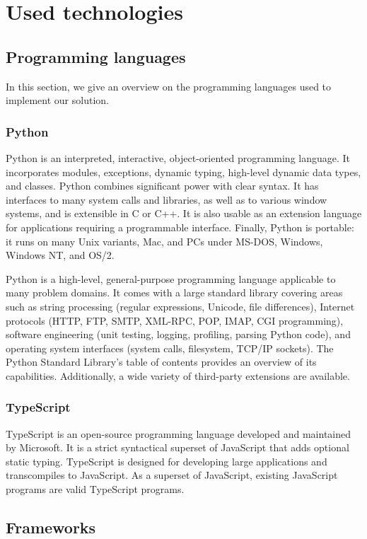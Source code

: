 \section{Used technologies}

\subsection{Programming languages}
In this section, we give an overview on the programming languages used to implement our solution.
\subsubsection{Python}
Python is an interpreted, interactive, object-oriented programming language. It incorporates modules, exceptions, dynamic typing, high-level dynamic data types, and classes. Python combines significant power with clear syntax. It has interfaces to many system calls and libraries, as well as to various window systems, and is extensible in C or C++. It is also usable as an extension language for applications requiring a programmable interface. Finally, Python is portable: it runs on many Unix variants, Mac, and PCs under MS-DOS, Windows, Windows NT, and OS/2.

Python is a high-level, general-purpose programming language applicable to many problem domains. It comes with a large standard library covering areas such as string processing (regular expressions, Unicode, file differences), Internet protocols (HTTP, FTP, SMTP, XML-RPC, POP, IMAP, CGI programming), software engineering (unit testing, logging, profiling, parsing Python code), and operating system interfaces (system calls, filesystem, TCP/IP sockets). The Python Standard Library's table of contents provides an overview of its capabilities. Additionally, a wide variety of third-party extensions are available.\cite{python}

\subsubsection{TypeScript}
TypeScript is an open-source programming language developed and maintained by Microsoft. It is a strict syntactical superset of JavaScript that adds optional static typing. TypeScript is designed for developing large applications and transcompiles to JavaScript. As a superset of JavaScript, existing JavaScript programs are valid TypeScript programs.\cite{typescript}

\subsection{Frameworks}
